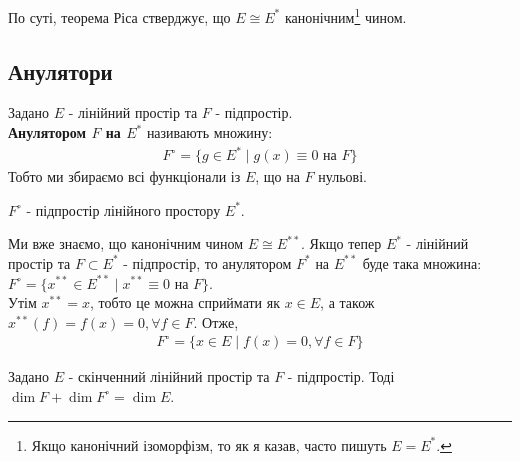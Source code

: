 \documentclass{math_library}
\begin{document}
\begin{remark}
По суті, теорема Ріса стверджує, що $E \cong E^*$ канонічним\footnote{Якщо канонічний ізоморфізм, то як я казав, часто пишуть $E = E^*$.} чином.
\end{remark}

\iffalse
\subsection{Анулятори}
\begin{definition}
Задано $E$ - лінійний простір та $F$ - підпростір.\\
\textbf{Анулятором $F$ на $E^*$} називають множину:
\begin{align*}
F^\circ = \{ g \in E^* \mid g(x) \equiv 0 \text{ на }F \}
\end{align*}
Тобто ми збираємо всі функціонали із $E$, що на $F$ нульові.
\end{definition}

\begin{remark}
$F^\circ$ - підпростір лінійного простору $E^*$.
\end{remark}

\begin{remark}
Ми вже знаємо, що канонічним чином $E \cong E^{**}$. Якщо тепер $E^*$ - лінійний простір та $F \subset E^*$ - підпростір, то анулятором $F^{*}$ на $E^{**}$ буде така множина:\\
$F^\circ = \{ x^{**} \in E^{**} \mid x^{**} \equiv 0 \text{ на }F \}$.\\
Утім $x^{**} = x$, тобто це можна сприймати як $x \in E$, а також $x^{**}(f) = f(x) = 0, \forall f \in F$. Отже,
\begin{align*}
F^\circ = \{ x \in E \mid f(x) = 0, \forall f \in F \}
\end{align*}
\end{remark}

\begin{theorem}
Задано $E$ - скінченний лінійний простір та $F$ - підпростір. Тоді \\ $\dim F + \dim F^\circ = \dim E$.
\end{theorem}
\end{document}
